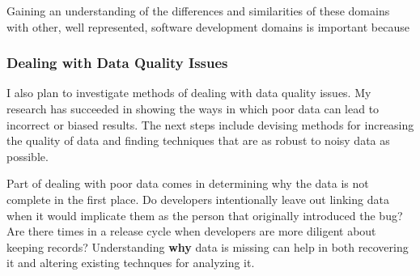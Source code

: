\documentclass[10pt]{article}
\newcommand\Subsection[1]{\subsubsection*{#1}}
\begin{document}
\begin{small}
\begin{enumerate}
\end{enumerate}

Gaining an understanding of the differences and similarities of these domains with other, well
represented, software development domains is important because 

\Subsection{Dealing with Data Quality Issues}

I also plan to investigate methods of dealing with data quality issues.  My
research has succeeded in showing the ways in which poor data can lead to
incorrect or biased results.  The next steps include devising methods for
increasing the quality of data and finding techniques that are as robust to
noisy data as possible.

Part of dealing with poor data comes in determining why the data is not complete
in the first place.  Do developers intentionally leave out linking data when it would
implicate them as the person that originally introduced the bug?  Are there times
in a release cycle when developers are more diligent about keeping records?  Understanding
\textbf{why} data is missing can help in both recovering it and altering existing technques
for analyzing it.

\vspace{0.5cm}

\end{small}

\begin{footnotesize}

%
%

\end{footnotesize}
\end{document}
